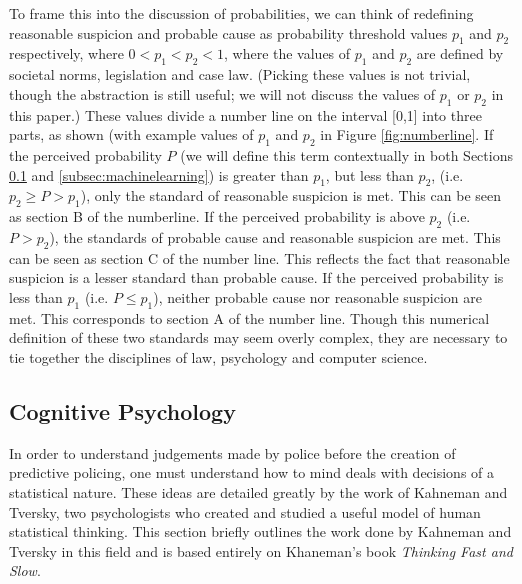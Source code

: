 \documentclass[12pt]{article} %
\begin{document}
To frame this into the discussion of probabilities, we can think of redefining reasonable suspicion and probable cause as probability threshold values $p_1$ and $p_2$ respectively, where $0 < p_1 < p_2 < 1$, where the values of $p_1$ and $p_2$ are defined by societal norms, legislation and case law. (Picking these values is not trivial, though the abstraction is still useful; we will not discuss the values of $p_1$ or $p_2$ in this paper.) These values divide a number line on the interval [0,1] into three parts, as shown (with example values of $p_1$ and $p_2$ in Figure \ref{fig:numberline}. If the perceived probability $P$ (we will define this term contextually in both Sections \ref{subsec:cognitive} and \ref{subsec:machinelearning}) is greater than $p_1$, but less than $p_2$, (i.e. $p_2 \geq P > p_1$), only the standard of reasonable suspicion is met. This can be seen as section B of the numberline. If the perceived probability is above $p_2$ (i.e. $P > p_2$), the standards of probable cause and reasonable suspicion are met. This can be seen as section C of the number line. This reflects the fact that reasonable suspicion is a lesser standard than probable cause. If the perceived probability is less than $p_1$ (i.e. $P \leq p_1$), neither probable cause nor reasonable suspicion are met. This corresponds to section A of the number line. Though this numerical definition of these two standards may seem overly complex, they are necessary to tie together the disciplines of law, psychology and computer science.

\subsection{Cognitive Psychology} \label{subsec:cognitive}
In order to understand judgements made by police before the creation of predictive policing, one must understand how to mind deals with decisions of a statistical nature. These ideas are detailed greatly by the work of Kahneman and Tversky, two psychologists who created and studied a useful model of human statistical thinking. This section briefly outlines the work done by Kahneman and Tversky in this field and is based entirely on Khaneman's book \textit{Thinking Fast and Slow}.\cite{kahneman}
\end{document}
